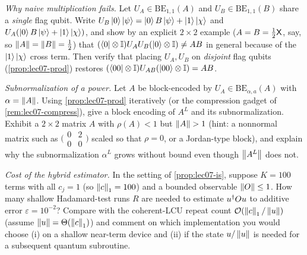 \begin{exercise}\label{ex:lec07-5}
\emph{Why naive multiplication fails.} Let $U_A\in\mathrm{BE}_{1,1}(A)$ and
$U_B\in\mathrm{BE}_{1,1}(B)$ share a \emph{single} flag qubit. Write $U_B\ket0\ket
\psi=\ket0 B\ket\psi+\ket1\ket{\chi}$ and $U_A(\ket0 B\ket\psi+\ket1\ket\chi)$, and
show by an explicit $2\times2$ example ($A=B=\tfrac12\mathsf{X}$, say, so
$\left\lVert A \right\rVert=\left\lVert B \right\rVert=\tfrac12$) that
$(\bra0\otimes\mathbb{I})U_AU_B(\ket0\otimes\mathbb{I})\ne AB$ in general because of the
$\ket1\ket\chi$ cross term. Then verify that placing $U_A,U_B$ on \emph{disjoint}
flag qubits (\cref{prop:lec07-prod}) restores $(\bra{00}\otimes\mathbb{I})U_{AB}
(\ket{00}\otimes\mathbb{I})=AB$.
\end{exercise}

\begin{exercise}\label{ex:lec07-6}
\emph{Subnormalization of a power.} Let $A$ be block-encoded by
$U_A\in\mathrm{BE}_{\alpha,a}(A)$ with $\alpha=\left\lVert A \right\rVert$. Using
\cref{prop:lec07-prod} iteratively (or the compression gadget of
\cref{rem:lec07-compress}), give a block encoding of $A^L$ and its subnormalization.
Exhibit a $2\times2$ matrix $A$ with $\rho(A)<1$ but $\left\lVert A \right\rVert>1$ (hint: a
nonnormal matrix such as $\bigl(\begin{smallmatrix}0&2\\0&0\end{smallmatrix}\bigr)$
scaled so that $\rho=0$, or a Jordan-type block), and explain why the
subnormalization $\alpha^L$ grows without bound even though $\left\lVert A^L \right\rVert$ does not.
\end{exercise}

\begin{exercise}\label{ex:lec07-7}
\emph{Cost of the hybrid estimator.} In the setting of \cref{prop:lec07-is}, suppose
$K=100$ terms with all $c_j=1$ (so $\left\lVert c \right\rVert_1=100$) and a bounded observable
$\left\lVert O \right\rVert\le1$. How many shallow Hadamard-test runs $R$ are needed to estimate
$u^{\dagger} Ou$ to additive error $\varepsilon=10^{-2}$? Compare with the coherent-LCU
repeat count $\mathcal{O}(\left\lVert c \right\rVert_1/\left\lVert u \right\rVert)$ (assume $\left\lVert u \right\rVert=\Theta(\left\lVert c \right\rVert_1)$) and
comment on which implementation you would choose (i) on a shallow near-term device
and (ii) if the state $u/\left\lVert u \right\rVert$ is needed for a subsequent quantum subroutine.
\end{exercise}


